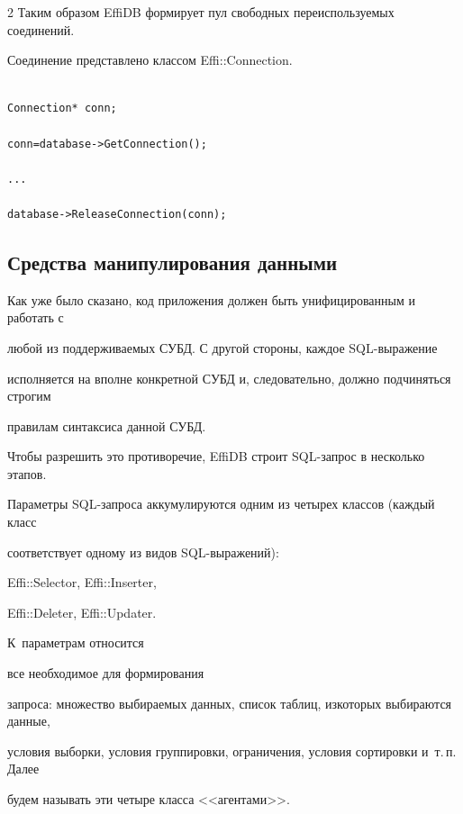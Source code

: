 \begin{multicols}{2}
Таким образом \mbox{EffiDB} формирует пул свободных переиспользуемых соединений.



Соединение представлено классом {\sf Effi::\linebreak Connection}. 

\begin{verbatim}

Connection* conn;

conn=database->GetConnection();

...

database->ReleaseConnection(conn);

\end{verbatim}



\subsection{Средства манипулирования данными} %



Как уже было сказано, код приложения должен быть унифицированным и работать с 

любой из поддерживаемых СУБД. С другой стороны, каждое SQL-вы\-ра\-же\-ние 

исполняется на вполне конкретной СУБД и, следовательно, должно подчиняться строгим 

правилам синтаксиса данной СУБД.



Чтобы разрешить это противоречие, EffiDB строит SQL-запрос в несколько этапов. 

Па\-ра\-мет\-ры SQL-за\-про\-са аккумулируются одним из четырех классов (каждый класс 

соответствует одному из видов SQL-вы\-ра\-же\-ний): 

{\sf Effi::Selector}, {\sf Effi::Inserter}, 

{\sf Effi::Deleter}, {\sf Effi::Updater}. 

К~параметрам относится\linebreak

 все необходимое для формирования 

запроса: множество выбираемых данных, список таблиц, из\linebreak которых выбираются данные, 

условия выборки, условия группировки, ограничения, условия сортировки и~т.\,п. Далее 

будем называть эти четыре класса <<агентами>>.




\end{multicols}
